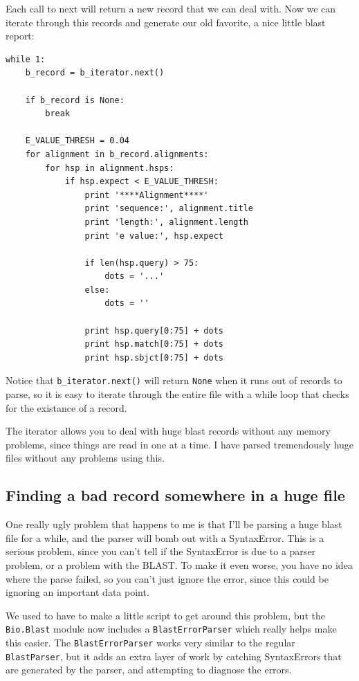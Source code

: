\documentclass{report}
\begin{document}
Each call to next will return a new record that we can deal with. Now we can iterate through this records and generate our old favorite, a nice little blast report:

\begin{verbatim}
while 1:
    b_record = b_iterator.next()

    if b_record is None:
        break

    E_VALUE_THRESH = 0.04
    for alignment in b_record.alignments:
        for hsp in alignment.hsps:
            if hsp.expect < E_VALUE_THRESH:
                print '****Alignment****'
                print 'sequence:', alignment.title
                print 'length:', alignment.length
                print 'e value:', hsp.expect

                if len(hsp.query) > 75:
                    dots = '...'
                else:
                    dots = ''
                
                print hsp.query[0:75] + dots
                print hsp.match[0:75] + dots
                print hsp.sbjct[0:75] + dots
\end{verbatim}

Notice that \verb|b_iterator.next()| will return \verb|None| when it runs out of records to parse, so it is easy to iterate through the entire file with a while loop that checks for the existance of a record.


The iterator allows you to deal with huge blast records without any memory problems, since things are read in one at a time. I have parsed tremendously huge files without any problems using this.

\subsection{Finding a bad record somewhere in a huge file}

One really ugly problem that happens to me is that I'll be parsing a huge blast file for a while, and the parser will bomb out with a SyntaxError. This is a serious problem, since you can't tell if the SyntaxError is due to a parser problem, or a problem with the BLAST. To make it even worse, you have no idea where the parse failed, so you can't just ignore the error, since this could be ignoring an important data point.


We used to have to make a little script to get around this problem, but the \verb|Bio.Blast| module now includes a \verb|BlastErrorParser| which really helps make this easier. The \verb|BlastErrorParser| works very similar to the regular \verb|BlastParser|, but it adds an extra layer of work by catching SyntaxErrors that are generated by the parser, and attempting to diagnose the errors.
\end{document}
